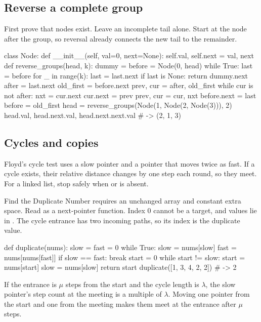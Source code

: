 \documentclass[11pt]{article}
\newcommand{\cd}[1]{{\frenchspacing\texttt{\detokenize{#1}}}}
\begin{document}
\subsection{Reverse a complete group}
First prove that \cd{k} nodes exist. Leave an incomplete tail alone.
Start \cd{prev} at the node after the group, so reversal already connects the new tail to the remainder.
\par\noindent\begin{minipage}{\linewidth}
\hypertarget{example-start-28}{}
\begin{pyex}
class Node:
    def __init__(self, val=0, next=None):
        self.val, self.next = val, next
def reverse_groups(head, k):
    dummy = before = Node(0, head)
    while True:
        last = before
        for _ in range(k):
            last = last.next
            if last is None:
                return dummy.next
        after = last.next
        old_first = before.next
        prev, cur = after, old_first
        while cur is not after:
            nxt = cur.next
            cur.next = prev
            prev, cur = cur, nxt
        before.next = last
        before = old_first
head = reverse_groups(Node(1, Node(2, Node(3))), 2)
head.val, head.next.val, head.next.next.val # -> (2, 1, 3)
\end{pyex}
\hypertarget{example-end-28}{}
\end{minipage}\par

\subsection{Cycles and copies}
Floyd's cycle test uses a slow pointer and a pointer that moves twice as fast.
If a cycle exists, their relative distance changes by one step each round, so they meet.
For a linked list, stop safely when \cd{fast} or \cd{fast.next} is absent.

Find the Duplicate Number requires an unchanged array and constant extra space.
Read \cd{i -> nums[i]} as a next-pointer function. Index 0 cannot be a target, and values lie in \cd{1..n}.
The cycle entrance has two incoming paths, so its index is the duplicate value.
\par\noindent\begin{minipage}{\linewidth}
\hypertarget{example-start-29}{}
\begin{pyex}
def duplicate(nums):
    slow = fast = 0
    while True:
        slow = nums[slow]
        fast = nums[nums[fast]]
        if slow == fast:
            break
    start = 0
    while start != slow:
        start = nums[start]
        slow = nums[slow]
    return start
duplicate([1, 3, 4, 2, 2])           # -> 2
\end{pyex}
\hypertarget{example-end-29}{}
\end{minipage}\par
If the entrance is \(\mu\) steps from the start and the cycle length is \(\lambda\), the slow pointer's step count at the meeting is a multiple of \(\lambda\).
Moving one pointer from the start and one from the meeting makes them meet at the entrance after \(\mu\) steps.
\end{document}
